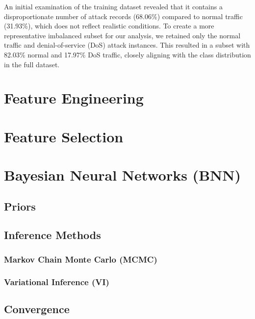 \documentclass[
  a4paper,
]{scrreprt}
\begin{document}
An initial examination of the training dataset revealed that it contains
a disproportionate number of attack records (68.06\%) compared to normal
traffic (31.93\%), which does not reflect realistic conditions. To
create a more representative imbalanced subset for our analysis, we
retained only the normal traffic and denial-of-service (DoS) attack
instances. This resulted in a subset with 82.03\% normal and 17.97\% DoS
traffic, closely aligning with the class distribution in the full
dataset.

\section{Feature Engineering}\label{feature-engineering}

\section{Feature Selection}\label{feature-selection}

\section{Bayesian Neural Networks
(BNN)}\label{bayesian-neural-networks-bnn}

\subsection{Priors}\label{priors}

\subsection{Inference Methods}\label{inference-methods}

\subsubsection{Markov Chain Monte Carlo
(MCMC)}\label{markov-chain-monte-carlo-mcmc}

\subsubsection{Variational Inference
(VI)}\label{variational-inference-vi}

\subsection{Convergence}\label{convergence}
\end{document}
